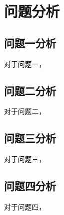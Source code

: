 \newpage
\section{问题分析}
\subsection{问题一分析}
对于问题一，



\subsection{问题二分析} 
对于问题二，



\subsection{问题三分析}
对于问题三，



\subsection{问题四分析}
对于问题四，



